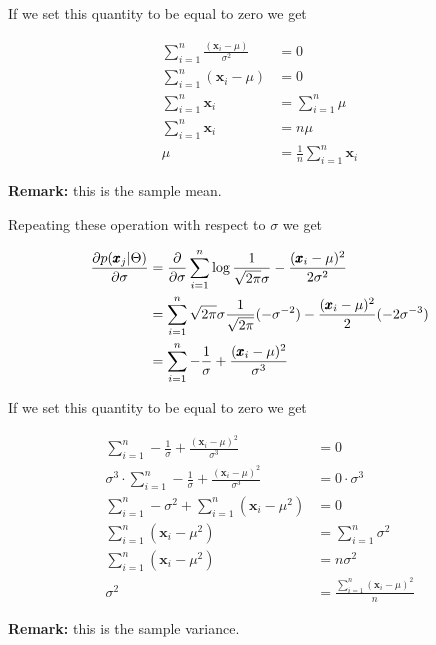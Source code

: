     	If we set this quantity to be equal to zero we get
    	
    	\begin{align*}
        	\sum_{i=1}^n \frac{(\pmb{x}_i - \mu)}{\sigma^2} &= 0\\
        	\sum_{i=1}^n (\pmb{x}_i - \mu) &= 0\\
        	\sum_{i=1}^n \pmb{x}_i &= \sum_{i=1}^n \mu\\
        	\sum_{i=1}^n \pmb{x}_i &= n \mu\\
        	\mu &= \frac{1}{n}\sum_{i=1}^n \pmb{x}_i
    	\end{align*}
    	
    	\textbf{Remark:} this is the sample mean. \newline
    	
    	Repeating these operation with respect to $\sigma$ we get	
    	
    	\begin{align*}
    	\pdv {p(\pmb{x}_j|\Theta)}{\sigma} &= \pdv{}{\sigma} \sum_{i=1}^n \log \frac{1}{\sqrt{2\pi}\sigma} - \frac{(\pmb{x}_i-\mu)^2}{2\sigma^2}\\
    	&= \sum_{i=1} ^n \sqrt{2 \pi} \sigma \frac{1}{\sqrt{2 \pi}}(- \sigma^{-2})-\frac{(\pmb{x}_i - \mu)^2}{2} (-2 \sigma^{-3}) \\
    	&= \sum_{i=1} ^n -\frac{1}{\sigma} + \frac{(\pmb{x}_i - \mu)^2}{\sigma^3}
    	\end{align*}
    	
    	If we set this quantity to be equal to zero we get
    	
    	\begin{align*}
    	    \sum_{i=1} ^n -\frac{1}{\sigma} + \frac{(\pmb{x}_i - \mu)^2}{\sigma^3} &= 0\\
        	\sigma^3 \cdot \sum_{i=1} ^n -\frac{1}{\sigma} + \frac{(\pmb{x}_i - \mu)^2}{\sigma^3} &= 0 \cdot \sigma^3\\
        	\sum_{i=1}^n -\sigma^2 + \sum_{i=1}^n (\pmb{x}_i - \mu^2) &= 0\\
        	\sum_{i=1}^n (\pmb{x}_i - \mu^2) &= \sum_{i=1}^n \sigma^2\\
        	\sum_{i=1}^n (\pmb{x}_i - \mu^2) &= n \sigma^2\\
        	\sigma^2 &= \frac{\sum_{i=1}^n (\pmb{x}_i - \mu)^2}{n}
    	\end{align*}
    	
    	\textbf{Remark:} this is the sample variance. \newline
    	
